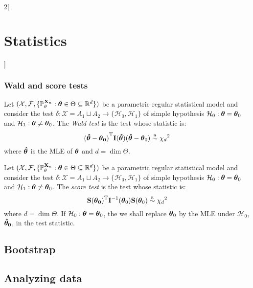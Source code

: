 \documentclass[../../../main.tex]{subfiles}
\begin{document}
\begin{multicols}{2}[\section{Statistics}]
  \subsubsection{Wald and score tests}
  \begin{definition}
    Let $(\mathcal{X},\mathcal{F},\{\mathbb{P}_\theta^{\boldsymbol{\mathrm{X}}_n}:\boldsymbol{\mathrm{\theta}}\in\Theta\subseteq\mathbb{R}^d\})$ be a parametric regular statistical model and consider the test $\delta:\mathcal{X}=A_1\sqcup A_2\rightarrow\{\mathcal{H}_0,\mathcal{H}_1\}$ of simple hypothesis $\mathcal{H}_0:\boldsymbol{\mathrm{\theta}}=\boldsymbol{\mathrm{\theta}}_0$ and $\mathcal{H}_1:\boldsymbol{\mathrm{\theta}}\ne\boldsymbol{\mathrm{\theta}}_0$. The \emph{Wald test} is the test whose statistic is: $$\vb{(\boldsymbol{\mathrm{\hat\theta}}-\boldsymbol{\mathrm{\theta}}_0)}^{\mathrm{T}}\boldsymbol{\mathrm{I}}(\boldsymbol{\mathrm{\hat\theta}})(\boldsymbol{\mathrm{\hat\theta}}-\boldsymbol{\mathrm{\theta}}_0)\overset{\text{a}}{\sim}{\chi_d}^2$$ where $\boldsymbol{\mathrm{\hat\theta}}$ is the MLE of $\boldsymbol{\mathrm{\theta}}$ and $d=\dim\Theta$.
  \end{definition}
  \begin{definition}
    Let $(\mathcal{X},\mathcal{F},\{\mathbb{P}_\theta^{\boldsymbol{\mathrm{X}}_n}:\boldsymbol{\mathrm{\theta}}\in\Theta\subseteq\mathbb{R}^d\})$ be a parametric regular statistical model and consider the test $\delta:\mathcal{X}=A_1\sqcup A_2\rightarrow\{\mathcal{H}_0,\mathcal{H}_1\}$ of simple hypothesis $\mathcal{H}_0:\boldsymbol{\mathrm{\theta}}=\boldsymbol{\mathrm{\theta}}_0$ and $\mathcal{H}_1:\boldsymbol{\mathrm{\theta}}\ne\boldsymbol{\mathrm{\theta}}_0$. The \emph{score test} is the test whose statistic is: $$\vb{\boldsymbol{\mathrm{S}}(\boldsymbol{\mathrm{\theta}}_0)}^{\mathrm{T}}\boldsymbol{\mathrm{I}}^{-1}(\boldsymbol{\mathrm{\theta}}_0)\boldsymbol{\mathrm{S}}(\boldsymbol{\mathrm{\theta}}_0)\overset{\text{a}}{\sim}{\chi_d}^2$$ where $d=\dim\Theta$. If $\mathcal{H}_0:\boldsymbol{\mathrm{\theta}}=\boldsymbol{\mathrm{\theta}}_0$, the we shall replace $\boldsymbol{\mathrm{\theta}}_0$ by the MLE under $\mathcal{H}_0$, $\boldsymbol{\mathrm{\hat\theta_0}}$, in the test statistic.
  \end{definition}
  \subsection{Bootstrap}
  \subsection{Analyzing data}

\end{multicols}
\end{document}
